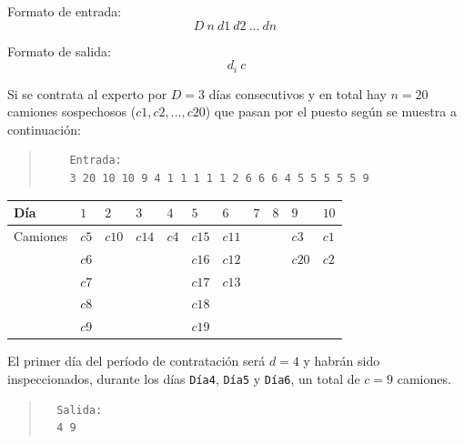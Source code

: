 \documentclass[11pt, a4paper, twoside]{article}
\begin{document}
Formato de entrada:
\[
  D\ n\ d1\ d2\ ...\ dn\
\]

Formato de salida:
\[
  d_i\ c
\]

\vspace{3em}

Si se contrata al experto por $D=3$ días consecutivos y en total hay $n=20$
camiones sospechosos ($c1,c2,...,c20$) que pasan por el puesto según se muestra
a continuación:

\begin{ejemplo}\hspace{0em}

  \begin{quote}
    \begin{verbatim}
    Entrada:
    3 20 10 10 9 4 1 1 1 1 1 2 6 6 6 4 5 5 5 5 5 9
    \end{verbatim}
  \end{quote}

    \begin{center}
      \begin{tabular}{|l|l|l|l|l|l|l|l|l|l|l|}
      	\hline
      	Día          &  $1$  & $2$   & $3$   & $4$   & $5$   & $6$ & $7$ & $8$ & $9$   & $10$  \\
      	\hline
      	Camiones     &  $c5$ & $c10$ & $c14$ & $c4$  & $c15$ & $c11$ &   &     & $c3$  & $c1$  \\
      				 &  $c6$ &       &       &       & $c16$ & $c12$ &   &     & $c20$ & $c2$  \\    
      				 &	$c7$ &       &       &       & $c17$ & $c13$ &   &     &       &       \\  
      				 &	$c8$ &       &       &       & $c18$ &       &   &     &       &       \\
      				 &	$c9$ &       &       &       & $c19$ &       &   &     &       &       \\
      	\hline
      \end{tabular}
    \end{center}

    El primer día del período de contratación será $d=4$ y habrán sido
  inspeccionados, durante los días \texttt{Día4}, \texttt{Día5} y \texttt{Día6},
  un total de $c=9$ camiones. 

  \begin{quote}
  \begin{verbatim}
  Salida:
  4 9
  \end{verbatim}
  \end{quote}

\end{ejemplo}
\end{document}
